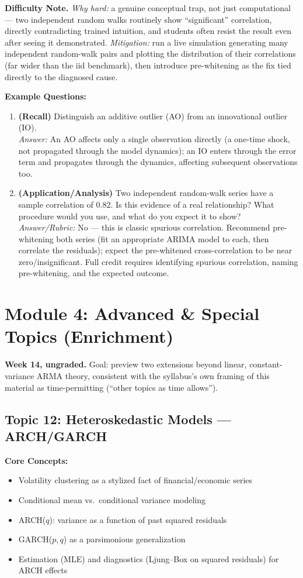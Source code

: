 \documentclass[11pt]{article}
\begin{document}
\textbf{Difficulty Note.} \emph{Why hard:} a genuine conceptual trap, not just computational --- two independent random walks routinely show ``significant'' correlation, directly contradicting trained intuition, and students often resist the result even after seeing it demonstrated. \emph{Mitigation:} run a live simulation generating many independent random-walk pairs and plotting the distribution of their correlations (far wider than the iid benchmark), then introduce pre-whitening as the fix tied directly to the diagnosed cause.

\textbf{Example Questions:}
\begin{enumerate}
\item \textbf{(Recall)} Distinguish an additive outlier (AO) from an innovational outlier (IO). \\
\emph{Answer:} An AO affects only a single observation directly (a one-time shock, not propagated through the model dynamics); an IO enters through the error term and propagates through the dynamics, affecting subsequent observations too.
\item \textbf{(Application/Analysis)} Two independent random-walk series have a sample correlation of 0.82. Is this evidence of a real relationship? What procedure would you use, and what do you expect it to show? \\
\emph{Answer/Rubric:} No --- this is classic spurious correlation. Recommend pre-whitening both series (fit an appropriate ARIMA model to each, then correlate the residuals); expect the pre-whitened cross-correlation to be near zero/insignificant. Full credit requires identifying spurious correlation, naming pre-whitening, and the expected outcome.
\end{enumerate}

\section{Module 4: Advanced \& Special Topics (Enrichment)}
\textbf{Week 14, ungraded.} Goal: preview two extensions beyond linear, constant-variance ARMA theory, consistent with the syllabus's own framing of this material as time-permitting (``other topics as time allows'').

\subsection{Topic 12: Heteroskedastic Models --- ARCH/GARCH}

\textbf{Core Concepts:}
\begin{itemize}
\item Volatility clustering as a stylized fact of financial/economic series
\item Conditional mean vs.\ conditional variance modeling
\item ARCH($q$): variance as a function of past squared residuals
\item GARCH($p,q$) as a parsimonious generalization
\item Estimation (MLE) and diagnostics (Ljung--Box on squared residuals) for ARCH effects
\end{itemize}
\end{document}
